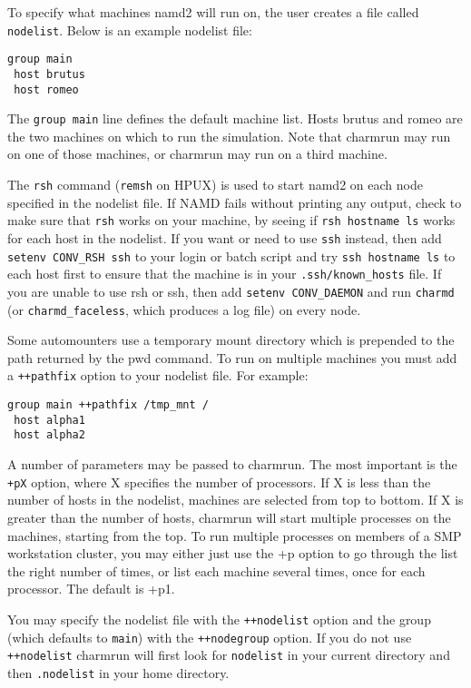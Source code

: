 To specify what machines namd2 will run on, the user creates a file
called \verb#nodelist#.  Below is an example nodelist file:

\begin{verbatim}
group main
 host brutus
 host romeo
\end{verbatim}

The \verb#group main# line defines the default machine list.  Hosts brutus
and romeo are the two machines on which to run the simulation.  Note
that charmrun may run on one of those machines, or charmrun may run
on a third machine.

The \verb#rsh# command (\verb#remsh# on HPUX) is used to start namd2 on each node
specified in the nodelist file.  If NAMD fails without printing any
output, check to make sure that \verb#rsh# works on your machine, by seeing
if \verb#rsh hostname ls# works for each host in the nodelist.  If you want
or need to use \verb#ssh# instead, then add \verb#setenv CONV_RSH ssh# to your
login or batch script and try \verb#ssh hostname ls# to each host first to
ensure that the machine is in your \verb#.ssh/known_hosts# file.  If you are
unable to use rsh or ssh, then add \verb#setenv CONV_DAEMON# and run \verb#charmd#
(or \verb#charmd_faceless#, which produces a log file) on every node.

Some automounters use a temporary mount directory which is prepended
to the path returned by the pwd command.  To run on multiple machines
you must add a \verb#++pathfix# option to your nodelist file.  For example:

\begin{verbatim}
group main ++pathfix /tmp_mnt /
 host alpha1
 host alpha2
\end{verbatim}

A number of parameters may be passed to charmrun.  The most important
is the \verb#+pX# option, where X specifies the number of processors.  If X
is less than the number of hosts in the nodelist, machines are
selected from top to bottom.  If X is greater than the number of
hosts, charmrun will start multiple processes on the machines,
starting from the top.  To run multiple processes on members of a SMP
workstation cluster, you may either just use the +p option to go
through the list the right number of times, or list each machine
several times, once for each processor.  The default is +p1.

You may specify the nodelist file with the \verb#++nodelist# option and the
group (which defaults to \verb#main#) with the \verb#++nodegroup# option.  If
you do not use \verb#++nodelist# charmrun will first look for \verb#nodelist#
in your current directory and then \verb#.nodelist# in your home directory.

